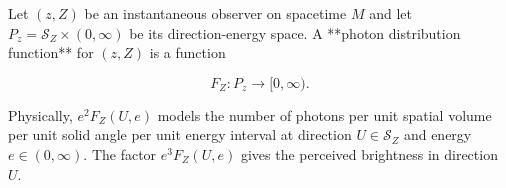 Let $(z, Z)$ be an instantaneous observer on spacetime $M$ and let $P_z = \mathcal{S}_Z \times (0, \infty)$ be its direction-energy space. A **photon distribution function** for $(z, Z)$ is a function

$$F_Z: P_z \to [0, \infty).$$

Physically, $e^2 F_Z(U, e)$ models the number of photons per unit spatial volume per unit solid angle per unit energy interval at direction $U \in \mathcal{S}_Z$ and energy $e \in (0, \infty)$. The factor $e^3 F_Z(U, e)$ gives the perceived brightness in direction $U$.
